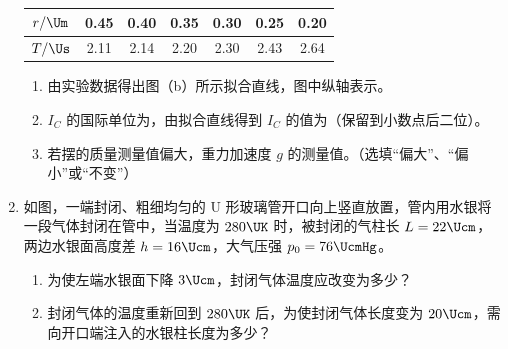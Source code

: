 \documentclass[\gkver]{gaokaozhenti}
\begin{document}
\begin{enumerate}
\begin{center}
\begin{tabular}{|c|cccccc|}
\hline
$r/\Um$ & 0.45 & 0.40 & 0.35 & 0.30 & 0.25 & 0.20 \\
\hline
$T/\Us$ & 2.11 & 2.14 & 2.20 & 2.30 & 2.43 & 2.64 \\
\hline
\end{tabular}
\end{center}
\begin{enumerate}
	\item
	由实验数据得出图（b）所示拟合直线，图中纵轴表示。
	\item
	$I_{C}$ 的国际单位为，由拟合直线得到 $I_{C}$ 的值为（保留到小数点后二位）。
	\item
	若摆的质量测量值偏大，重力加速度 $g$ 的测量值。（选填“偏大”、“偏小”或“不变”）
\end{enumerate}
\twopicture[align=right, hA=4.40cm, hB=6.93cm]
{}
{}

\item
如图，一端封闭、粗细均匀的 U 形玻璃管开口向上竖直放置，管内用水银将一段气体封闭在管中，当温度为 $280\UK$ 时，被封闭的气柱长 $L = 22\Ucm$，两边水银面高度差 $h = 16\Ucm$，大气压强 $p_{0} = 76\UcmHg$。
\begin{enumerate}
	\item
	为使左端水银面下降 $3\Ucm$，封闭气体温度应改变为多少？
	\item
	封闭气体的温度重新回到 $280\UK$ 后，为使封闭气体长度变为 $20\Ucm$，需向开口端注入的水银柱长度为多少？
\end{enumerate}
\onepicture[align=right, h=3.62cm]{}
\end{enumerate}
\end{document}
